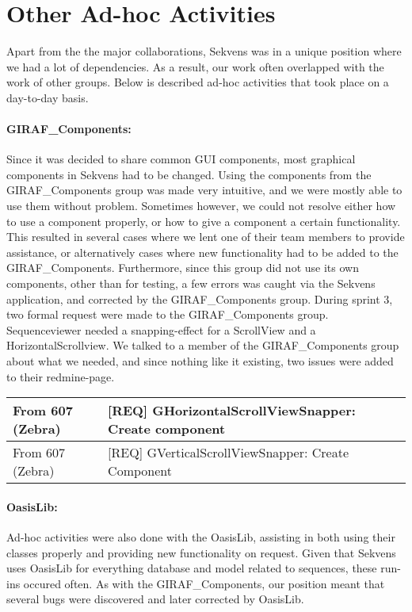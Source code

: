 \section{Other Ad-hoc Activities}\label{sec:adhoc}
Apart from the the major collaborations, Sekvens was in a unique position where we had a lot of dependencies. As a result, our work often overlapped with the work of other groups. Below is described ad-hoc activities that took place on a day-to-day basis.

\paragraph{GIRAF\_Components:}
Since it was decided to share common GUI components, most graphical components in Sekvens had to be changed. Using the components from the GIRAF\_Components group was made very intuitive, and we were mostly able to use them without problem. Sometimes however, we could not resolve either how to use a component properly, or how to give a component a certain functionality. This resulted in several cases where we lent one of their team members to provide assistance, or alternatively cases where new functionality had to be added to the GIRAF\_Components.  Furthermore, since this group did not use its own components, other than for testing, a few errors was caught via the Sekvens application, and corrected by the GIRAF\_Components group.\newline
\newline
\label{collaborationSnapper}During sprint 3, two formal request were made to the GIRAF\_Components group. Sequenceviewer needed a snapping-effect for a ScrollView and a HorizontalScrollview. We talked to a member of the GIRAF\_Components group about what we needed, and since nothing like it existing, two issues were added to their redmine-page. 

\begin{tabular}{| l | l |}
  \hline                       
[REQUEST] From 607 (Zebra) & [REQ] GHorizontalScrollViewSnapper: Create component \\ \hline
[REQUEST] From 607 (Zebra) & [REQ] GVerticalScrollViewSnapper: Create Component \\
  \hline  
\end{tabular}

\paragraph{OasisLib:}
Ad-hoc activities were also done with the OasisLib, assisting in both using their classes properly and providing new functionality on request. Given that Sekvens uses OasisLib for everything database and model related to sequences, these run-ins occured often. As with the GIRAF\_Components, our position meant that several bugs were discovered and later corrected by OasisLib.

